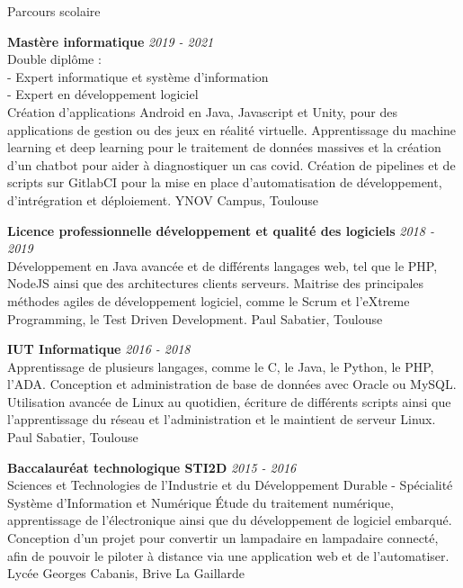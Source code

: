 \documentclass[
	10pt, %
]{resume} %
\begin{document}

\begin{rSection}{Parcours scolaire}
	
	\textbf{Mastère informatique} \hfill \textit{2019 - 2021} \\ 
	Double diplôme : \\
	- Expert informatique et système d'information \\ 
	- Expert en développement logiciel \\
	Création d'applications Android en Java, Javascript et Unity, pour des applications de gestion ou des jeux en réalité virtuelle. 
	Apprentissage du machine learning et deep learning pour le traitement de données massives et la création d'un chatbot pour aider à diagnostiquer un cas covid. 
	Création de pipelines et de scripts sur GitlabCI pour la mise en place d'automatisation de développement, d'intrégration et déploiement.
	\hfill { YNOV Campus, Toulouse }

	\textbf{Licence professionnelle développement et qualité des logiciels} \hfill {\em 2018 - 2019} \\ 
	Développement en Java avancée et de différents langages web, tel que le PHP, NodeJS ainsi que des architectures clients serveurs. 
	Maitrise des principales méthodes agiles de développement logiciel, comme le Scrum et l'eXtreme Programming, le Test Driven Development. 
	\hfill { Paul Sabatier, Toulouse }

	\textbf{IUT Informatique} \hfill {\em 2016 - 2018} \\
	Apprentissage de plusieurs langages, comme le C, le Java, le Python, le PHP, l'ADA. Conception et administration de base de données avec Oracle ou MySQL. 
	Utilisation avancée de Linux au quotidien, écriture de différents scripts ainsi que l'apprentissage du réseau et l'administration et le maintient de serveur Linux.
	\hfill { Paul Sabatier, Toulouse }

	{\bf Baccalauréat technologique STI2D } \hfill {\em 2015 - 2016} \\ 
	Sciences et Technologies de l'Industrie et du Développement Durable - Spécialité Système d'Information et Numérique
	Étude du traitement numérique, apprentissage de l'électronique ainsi que du développement de logiciel embarqué. 
	Conception d'un projet pour convertir un lampadaire en lampadaire connecté, afin de pouvoir le piloter à distance via une application web et de l'automatiser. 
	\hfill { Lycée Georges Cabanis, Brive La Gaillarde }

\end{rSection}
\end{document}
